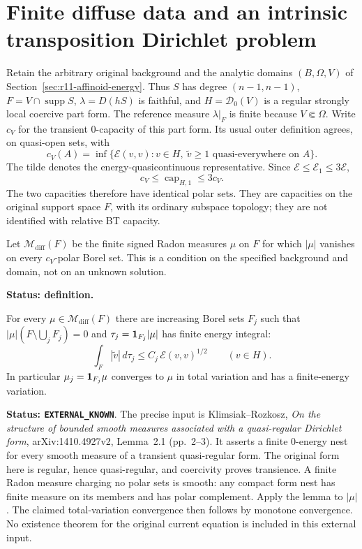 \section{Finite diffuse data and an intrinsic transposition Dirichlet problem}
\label{sec:r11-diffuse-dirichlet}

Retain the arbitrary original background and the analytic domains
$(B,\Omega,V)$ of Section~\ref{sec:r11-affinoid-energy}.  Thus
$S$ has degree $(n-1,n-1)$, $F=V\cap\operatorname{supp}S$,
$\lambda=D(hS)$ is faithful, and
$H=\mathscr D_0(V)$ is a regular strongly local coercive part form.
The reference measure $\lambda|_F$ is finite because $V\Subset\Omega$.
Write $c_V$ for the transient $0$-capacity of this part form.
Its usual outer definition agrees, on quasi-open sets, with
\[
 c_V(A)=\inf\{\mathcal E(v,v):v\in H,\ 
                              \widetilde v\geq1\text{ quasi-everywhere on }A\}.
 \tag{MD1}
\]
The tilde denotes the energy-quasicontinuous representative.
Since $\mathcal E\leq\mathcal E_1\leq3\mathcal E$,
\[
                    c_V\leq\operatorname{cap}_{H,1}\leq3c_V.
 \tag{MD2}
\]
The two capacities therefore have identical polar sets.
They are capacities on the original support space $F$, with
its ordinary subspace topology; they are not identified with
relative BT capacity.

\begin{definition}
\label{def:r11-energy-diffuse-data}
Let $\mathcal M_{\mathrm{diff}}(F)$ be the finite signed Radon
measures $\mu$ on $F$ for which $|\mu|$ vanishes on every
$c_V$-polar Borel set.  This is a condition on the specified
background and domain, not on an unknown solution.
\end{definition}

\noindent\textbf{Status: definition.}

\begin{lemma}
\label{lem:r11-finite-energy-nest}
For every $\mu\in\mathcal M_{\mathrm{diff}}(F)$ there are increasing
Borel sets $F_j$ such that
$|\mu|(F\setminus\bigcup_jF_j)=0$ and
$\tau_j={\bf1}_{F_j}|\mu|$ has finite energy integral:
\[
             \int_F|\widetilde v|\,d\tau_j
                         \leq C_j\,\mathcal E(v,v)^{1/2}
                                  \qquad(v\in H).
 \tag{MD3}
\]
In particular $\mu_j={\bf1}_{F_j}\mu$ converges to $\mu$ in
total variation and has a finite-energy variation.
\end{lemma}

\noindent\textbf{Status: \texttt{EXTERNAL\_KNOWN}}.
The precise input is Klimsiak--Rozkosz,
\emph{On the structure of bounded smooth measures associated with a
quasi-regular Dirichlet form}, arXiv:1410.4927v2,
Lemma~2.1 (pp.~2--3).  It asserts a finite $0$-energy nest
for every smooth measure of a transient quasi-regular form.
The original form here is regular, hence quasi-regular, and
coercivity proves transience.  A finite Radon measure charging
no polar sets is smooth: any compact form nest has finite
measure on its members and has polar complement.  Apply the
lemma to $|\mu|$.  The claimed total-variation convergence
then follows by monotone convergence.
No existence theorem for the original current equation is
included in this external input.

